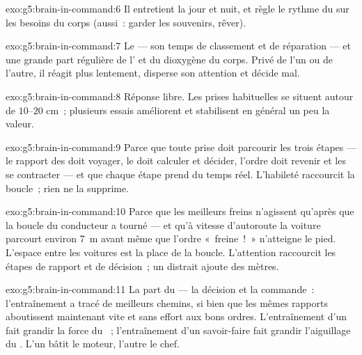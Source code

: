 \begin{solution}{exo:g5:brain-in-command:6}
Il entretient la  jour et nuit, et règle le rythme du
 sur les besoins du corps (aussi~: garder les souvenirs, rêver).
\end{solution}

\begin{solution}{exo:g5:brain-in-command:7}
Le  --- son temps de classement et de réparation --- et une
grande part régulière de l' et du dioxygène du corps. Privé
de l'un ou de l'autre, il réagit plus lentement, disperse son
attention et décide mal.
\end{solution}

\begin{solution}{exo:g5:brain-in-command:8}
Réponse libre. Les prises habituelles se situent autour de
$10$--$20$ cm~; plusieurs essais améliorent et stabilisent en
général un peu la valeur.
\end{solution}

\begin{solution}{exo:g5:brain-in-command:9}
Parce que toute prise doit parcourir les trois étapes --- le rapport
des  doit voyager, le  doit calculer et décider, l'ordre
doit revenir et les  se contracter --- et que chaque étape
prend du temps réel. L'habileté raccourcit la boucle~; rien ne la
supprime.
\end{solution}

\begin{solution}{exo:g5:brain-in-command:10}
Parce que les meilleurs freins n'agissent qu'après que la boucle du
conducteur a tourné --- et qu'à vitesse d'autoroute la voiture
parcourt environ \qty{7}{m} avant même que l'ordre «~freine~!~»
n'atteigne le pied. L'espace entre les voitures est la place de la
boucle. L'attention raccourcit les étapes de rapport et de décision~;
un  distrait ajoute des mètres.
\end{solution}

\begin{solution}{exo:g5:brain-in-command:11}
La part du  --- la décision et la commande~: l'entraînement a
tracé de meilleurs chemins, si bien que les mêmes rapports
aboutissent maintenant vite et sans effort aux bons ordres.
L'entraînement d'un  fait grandir la force du ~;
l'entraînement d'un savoir-faire fait grandir l'aiguillage du
. L'un bâtit le moteur, l'autre le chef.
\end{solution}
